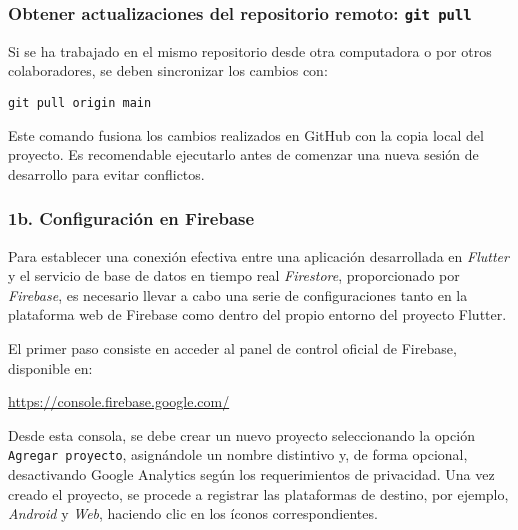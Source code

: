 \subsubsection*{Obtener actualizaciones del repositorio remoto: \texttt{git pull}}

Si se ha trabajado en el mismo repositorio desde otra computadora o por otros colaboradores, se deben sincronizar los cambios con:

\begin{verbatim}
git pull origin main
\end{verbatim}

Este comando fusiona los cambios realizados en GitHub con la copia local del proyecto. Es recomendable ejecutarlo antes de comenzar una nueva sesión de desarrollo para evitar conflictos.


















\subsubsection{1b. Configuración en Firebase} 
Para establecer una conexión efectiva entre una aplicación desarrollada en \textit{Flutter} y el servicio de base de datos en tiempo real \textit{Firestore}, proporcionado por \textit{Firebase}, es necesario llevar a cabo una serie de configuraciones tanto en la plataforma web de Firebase como dentro del propio entorno del proyecto Flutter.

El primer paso consiste en acceder al panel de control oficial de Firebase, disponible en:

\begin{center}
  \url{https://console.firebase.google.com/}
\end{center}

Desde esta consola, se debe crear un nuevo proyecto seleccionando la opción \texttt{Agregar proyecto}, asignándole un nombre distintivo y, de forma opcional, desactivando Google Analytics según los requerimientos de privacidad. Una vez creado el proyecto, se procede a registrar las plataformas de destino, por ejemplo, \textit{Android} y \textit{Web}, haciendo clic en los íconos correspondientes.

\vspace{1em}

